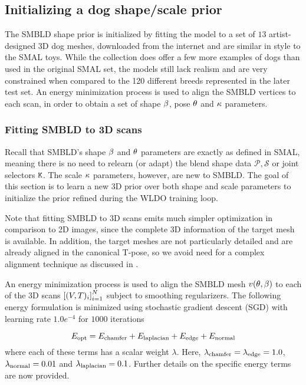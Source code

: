 

\subsection{Initializing a dog shape/scale prior}

The SMBLD shape prior is initialized by fitting the model to a set of $13$ artist-designed 3D dog meshes, downloaded from the internet and are similar in style to the SMAL toys. While the collection does offer a few more examples of dogs than used in the original SMAL set, the models still lack realism and are very constrained when compared to the 120 different breeds represented in the later test set. An energy minimization process is used to align the SMBLD vertices to each scan, in order to obtain a set of shape $\beta$, pose $\theta$ and $\kappa$ parameters. 

\subsubsection{Fitting SMBLD to 3D scans}

Recall that SMBLD's shape $\beta$ and $\theta$ parameters are exactly as defined in SMAL, meaning there is no need to relearn (or adapt) the blend shape data $\mathcal{P}, \mathcal{S}$ or joint selectors $\mathtt{K}$. The scale $\kappa$ parameters, however, are new to SMBLD. The goal of this section is to learn a new 3D prior over both shape and scale parameters to initialize the prior refined during the WLDO training loop.

Note that fitting SMBLD to 3D scans emits much simpler optimization in comparison to 2D images, since the complete 3D information of the target mesh is available. In addition, the target meshes are not particularly detailed and are already aligned in the canonical T-pose, so we avoid need for a complex alignment technique as discussed in . 


An energy minimization process is used to align the SMBLD mesh $v(\theta,\beta)$ to each of the 3D scans $\left[{(V, T)_{i}}\right]_{i=1}^{N}$ subject to smoothing regularizers. The following energy formulation is minimized using stochastic gradient descent (SGD) with learning rate $1.0e^{-4}$ for $1000$ iterations

\begin{equation}
    E_\textrm{opt} = E_\textrm{chamfer} + E_\textrm{laplacian} + E_\textrm{edge} + E_\textrm{normal}
\end{equation}
where each of these terms has a scalar weight $\lambda$. Here, $\lambda_\textrm{chamfer}=\lambda_\textrm{edge}=1.0$, $\lambda_\textrm{normal}=0.01$ and $\lambda_\textrm{laplacian}=0.1$. Further details on the specific energy terms are now provided.

